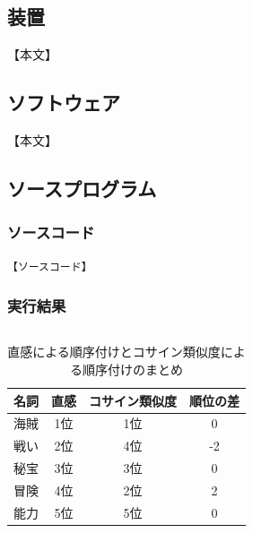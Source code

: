 \documentclass[a4paper, papersize]{jsarticle}
\begin{document}
\begin{multicols}{2}

  \subsection{装置}
  【本文】


  \subsection{ソフトウェア}
  【本文】


  \subsection{ソースプログラム}


  \subsubsection{ソースコード}

  \setcounter{lstlisting}{4}
  \renewcommand{\lstlistingname}{ソースコード}
  \begin{lstlisting}[caption = 【ファイル名】, label=【参照名】]
【ソースコード】
\end{lstlisting}


  \setcounter{lstlisting}{2}
  \renewcommand{\lstlistingname}{実行結果}
  \subsubsection{実行結果}
  \setcounter{lstlisting}{0}
  \renewcommand{\lstlistingname}{実行結果}
  \begin{lstlisting}[caption = 【ファイル名】 \quad 【ファイル名】, label = 【参照名】]
\end{lstlisting}


  \begin{table}[H]
    \centering
    \caption{直感による順序付けとコサイン類似度による順序付けのまとめ}
    \label{order_table}
    \begin{tabular}{l||ccc}
      \hline
      名詞 & 直感 & コサイン類似度 & 順位の差 \\ \hline
      海賊 & 1位  & 1位            & 0        \\ \hline
      戦い & 2位  & 4位            & -2       \\ \hline
      秘宝 & 3位  & 3位            & 0        \\ \hline
      冒険 & 4位  & 2位            & 2        \\ \hline
      能力 & 5位  & 5位            & 0        \\ \hline
    \end{tabular}
  \end{table}


\end{multicols}
\end{document}
